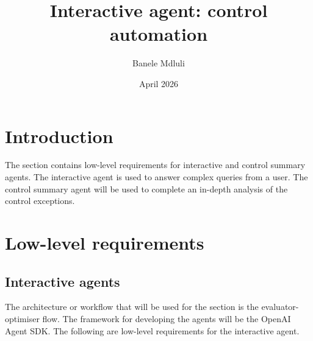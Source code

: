 \documentclass{article}
\title{Interactive agent: control automation}
\author{Banele Mdluli}
\date{April 2026}
\begin{document}
\maketitle
\newpage
\section{Introduction}
The section contains low-level requirements for interactive and control summary agents. The interactive agent is used to answer complex queries from a user. The control summary agent will be used to complete an in-depth analysis of the control exceptions. 

\section{Low-level requirements}
\subsection{Interactive agents}
The architecture or workflow that will be used for the section is the evaluator-optimiser flow. The framework for developing the agents will be the OpenAI Agent SDK. The following are low-level requirements for the interactive agent.
\end{document}
